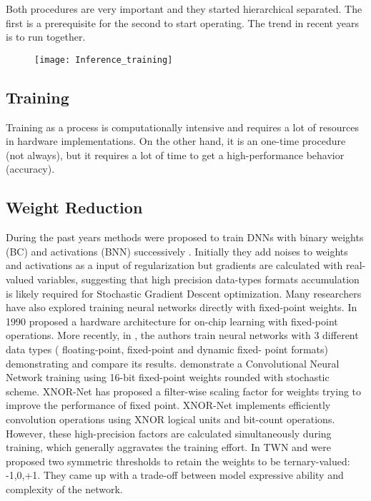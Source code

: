 Both procedures are very important and they started hierarchical separated. The first is a prerequisite for the second to start operating. The trend in recent years is to run together.


\begin{figure}[h]
\centering
\texttt{[image: Inference\_training]}
\label{fig:20}
\end{figure}


\subsection{Training}
Training as a process is computationally intensive and requires a lot of resources in hardware implementations. On the other hand, it is an one-time procedure (not always), but it requires a lot of time to get a high-performance behavior (accuracy).
\subsection{Weight Reduction}

During the past years methods were proposed  to train DNNs with binary weights (BC) and activations (BNN) successively \cite{Reference9} \cite{Reference5} . Initially they add noises to weights and activations as a input of regularization but gradients are calculated with real-valued variables, suggesting that high precision data-types formats accumulation is likely required for Stochastic Gradient Descent optimization. Many researchers  have  also  explored  training  neural  networks directly with fixed-point weights. In 1990 proposed a hardware architecture for on-chip learning with fixed-point operations.  More recently, in \cite{Reference5}, the authors train neural networks with 3 different data types ( floating-point, fixed-point and dynamic fixed- point  formats) demonstrating and compare its results. \cite{Reference22} demonstrate a Convolutional Neural Network training using 16-bit fixed-point weights rounded with stochastic scheme.  XNOR-Net \cite{Reference10} has proposed a filter-wise scaling factor for weights trying to improve the performance of fixed point.  XNOR-Net implements efficiently convolution operations using XNOR logical units and bit-count operations. However, these high-precision factors are calculated simultaneously during training, which generally aggravates the training effort. In TWN \cite{Reference11} and \cite{Reference12} were proposed two symmetric thresholds to retain the weights to be ternary-valued: {-1,0,+1}. They came up with a trade-off between model expressive ability and complexity of the network.




